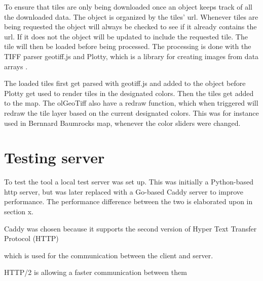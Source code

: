 To ensure that tiles are only being downloaded once an object keeps track of all the downloaded data. The object is organized by the tiles’ url. 
Whenever tiles are being requested the object will always be checked to see if it already contains the url. If it does not the object will be updated to include the requested tile. The tile will then be loaded before being processed. \citep{Baumrocks}
The processing is done with the TIFF parser geotiff.js 
\citep{Geotiff}
and Plotty, which is a library for creating images from data arrays \citep{Plotty}.

The loaded tiles first get parsed with geotiff.js and added to the object before Plotty get used to render tiles in the designated colors. Then the tiles get added to the map.
\citep{Baumrocks}
The olGeoTiff also have a redraw function, which when triggered will redraw the tile layer based on the current designated colors. This was for instance used in Bernnard Baumrocks map, whenever the color sliders were changed. 

\section{Testing server}
To test the tool a local test server was set up. This was initially a Python-based http server, but was later replaced with a Go-based Caddy server to improve performance. The performance difference between the two is elaborated upon in section x.

Caddy was chosen because it supports the second version of Hyper Text Transfer Protocol (HTTP)
\citep{WhyCaddy}



which is used for the communication between the client and server.
\citep{WhatIsHTTP}

HTTP/2 is allowing a faster communication between them

\citep{HTTP2}
